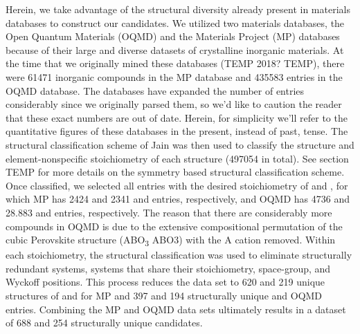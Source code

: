 Herein, we take advantage of the structural diversity already present in materials databases to construct our candidates.
%
We utilized two materials databases, the Open Quantum Materials (OQMD) and the Materials Project (MP) databases because of their large and diverse datasets of crystalline inorganic materials.
%
At the time that we originally mined these databases (TEMP 2018? TEMP), there were \num{61471} inorganic compounds in the MP database and \num{435583} entries in the OQMD database.
%
The databases have expanded the number of entries considerably since we originally parsed them, so we'd like to caution the reader that these exact numbers are out of date.
%
Herein, for simplicity we'll refer to the quantitative figures of these databases in the present, instead of past, tense.
%
The structural classification scheme of Jain  \cite{Jain2018} was then used to classify the structure and element-nonspecific stoichiometry of each structure (\num{497054} in total).
%
See section TEMP for more details on the symmetry based structural classification scheme.
%
Once classified, we selected all entries with the desired stoichiometry of \ABtwo and \ABthree,
for which MP has \num{2424} and \num{2341} \ABtwo and \ABthree entries, respectively,
and OQMD has \num{4736} and \num{28,883} \ABtwo and \ABthree entries, respectively.
%
The reason that there are considerably more \ABthree compounds in OQMD is due to the extensive compositional permutation of the cubic Perovskite structure (ABO\textsubscript{3} ABO3) with the A cation removed.
%
Within each stoichiometry, the structural classification was used to eliminate structurally redundant systems,  systems that share their stoichiometry, space-group, and Wyckoff positions.
%
This process reduces the data set to \num{620} and \num{219} unique structures of \ABtwo and \ABthree for MP and \num{397} and \num{194} structurally unique \ABtwo and \ABthree OQMD entries.
%
Combining the MP and OQMD data sets ultimately results in a dataset of \num{688} \ABtwo and \num{254} \ABthree structurally unique candidates.
%



